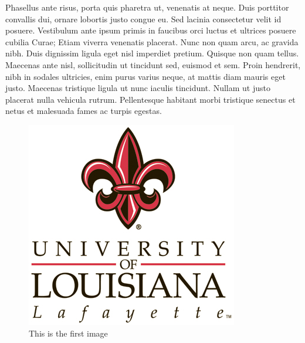 \documentclass[12pt]{report}	%
\begin{document}
  Phasellus ante risus, porta quis pharetra ut, venenatis at neque. Duis porttitor convallis dui, ornare lobortis justo congue eu. Sed lacinia consectetur velit id posuere. Vestibulum ante ipsum primis in faucibus orci luctus et ultrices posuere cubilia Curae; Etiam viverra venenatis placerat. Nunc non quam arcu, ac gravida nibh. Duis dignissim ligula eget nisl imperdiet pretium. Quisque non quam tellus. Maecenas ante nisl, sollicitudin ut tincidunt sed, euismod et sem. Proin hendrerit, nibh in sodales ultricies, enim purus varius neque, at mattis diam mauris eget justo. Maecenas tristique ligula ut nunc iaculis tincidunt. Nullam ut justo placerat nulla vehicula rutrum. Pellentesque habitant morbi tristique senectus et netus et malesuada fames ac turpis egestas.
\begin{figure}[htb]
  \centering
  \includegraphics[draft=false,width=0.4\linewidth]{ull1.jpg}
  \caption{This is the first image}
  \label{fig:ull1}
\end{figure}
  
\end{document}
